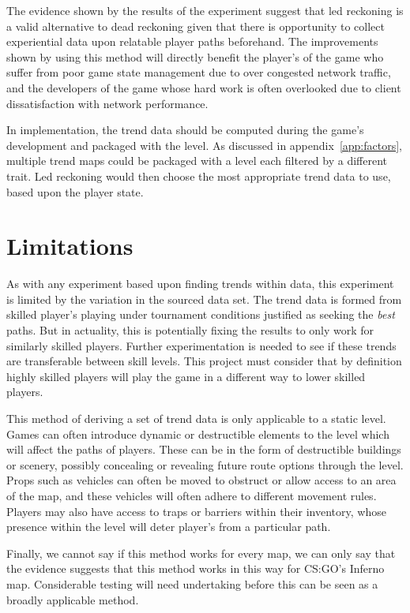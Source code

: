 \documentclass[journal]{IEEEtran}
\begin{document}
The evidence shown by the results of the experiment suggest that led reckoning is a valid alternative to dead reckoning given that there is opportunity to collect experiential data upon relatable player paths beforehand. The improvements shown by using this method will directly benefit the player's of the game who suffer from poor game state management due to over congested network traffic, and the developers of the game whose hard work is often overlooked due to client dissatisfaction with network performance.

In implementation, the trend data should be computed during the game's development and packaged with the level. As discussed in appendix~\ref{app:factors}, multiple trend maps could be packaged with a level each filtered by a different trait. Led reckoning would then choose the most appropriate trend data to use, based upon the player state.

\section{Limitations} \label{limitations}

As with any experiment based upon finding trends within data, this experiment is limited by the variation in the sourced data set. The trend data is formed from skilled player's playing under tournament conditions justified as seeking the \textit{best} paths. But in actuality, this is potentially fixing the results to only work for similarly skilled players. Further experimentation is needed to see if these trends are transferable between skill levels. This project must consider that by definition highly skilled players will play the game in a different way to lower skilled players.

This method of deriving a set of trend data is only applicable to a static level. Games can often introduce dynamic or destructible elements to the level which will affect the paths of players. These can be in the form of destructible buildings or scenery, possibly concealing or revealing future route options through the level. Props such as vehicles can often be moved to obstruct or allow access to an area of the map, and these vehicles will often adhere to different movement rules. Players may also have access to traps or barriers within their inventory, whose presence within the level will deter player's from a particular path.

Finally, we cannot say if this method works for every map, we can only say that the evidence suggests that this method works in this way for CS:GO's Inferno map. Considerable testing will need undertaking before this can be seen as a broadly applicable method.
\end{document}
